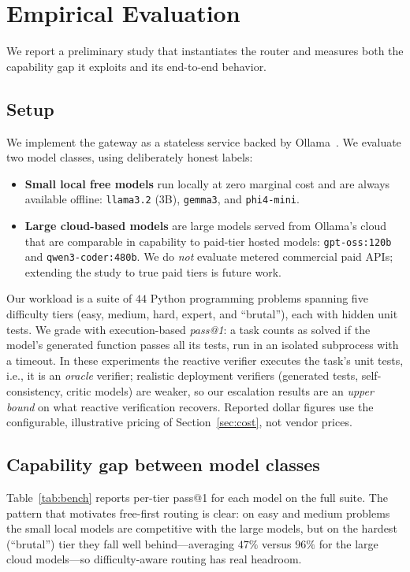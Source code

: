 \documentclass[11pt]{article}
\begin{document}
\section{Empirical Evaluation}
\label{sec:empirical}
We report a preliminary study that instantiates the router and measures both the
capability gap it exploits and its end-to-end behavior.

\subsection{Setup}
We implement the gateway as a stateless service backed by
Ollama~\cite{ollama}. We evaluate two model classes, using deliberately honest
labels:
\begin{itemize}
  \item \textbf{Small local free models} run locally at zero marginal cost and
        are always available offline: \texttt{llama3.2} (3B), \texttt{gemma3},
        and \texttt{phi4-mini}.
  \item \textbf{Large cloud-based models} are large models served from Ollama's
        cloud that are comparable in capability to paid-tier hosted models:
        \texttt{gpt-oss:120b} and \texttt{qwen3-coder:480b}. We do \emph{not}
        evaluate metered commercial paid APIs; extending the study to true paid
        tiers is future work.
\end{itemize}
Our workload is a suite of $44$ Python programming problems spanning five
difficulty tiers (easy, medium, hard, expert, and ``brutal''), each with hidden
unit tests. We grade with execution-based \emph{pass@1}: a task counts as solved
if the model's generated function passes all its tests, run in an isolated
subprocess with a timeout. In these experiments the reactive verifier executes
the task's unit tests, i.e., it is an \emph{oracle} verifier; realistic
deployment verifiers (generated tests, self-consistency, critic models) are
weaker, so our escalation results are an \emph{upper bound} on what reactive
verification recovers. Reported dollar figures use the configurable, illustrative
pricing of Section~\ref{sec:cost}, not vendor prices.

\subsection{Capability gap between model classes}
Table~\ref{tab:bench} reports per-tier pass@1 for each model on the full suite.
The pattern that motivates free-first routing is clear: on easy and medium
problems the small local models are competitive with the large models, but on
the hardest (``brutal'') tier they fall well behind---averaging $47\%$ versus
$96\%$ for the large cloud models---so difficulty-aware routing has real headroom.
\end{document}
